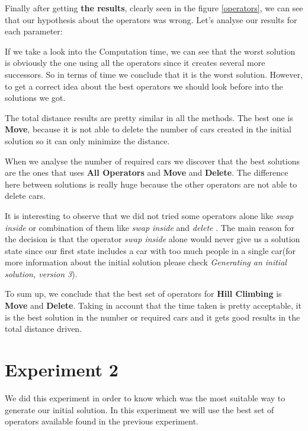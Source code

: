 \documentclass[12]{article}
\begin{document}
Finally after getting \textbf{the results}, clearly seen in the figure \ref{operators}, we can see that our hypothesis about the operators was wrong. Let's analyse our results for each parameter: 
\\
\smallskip

If we take a look into the Computation time, we can see that the worst solution is obviously the one using all the operators since it creates several more successors. So in terms of time we conclude that it is the worst solution. However, to get a correct idea about the best operators we should look before into the solutions we got. 
\\
\smallskip

The total distance results are pretty similar in all the methods. The best one is \textbf{Move}, because it is not able to delete the number of cars created in the initial solution so it can only minimize the distance.  
\\
\smallskip

When we analyse the number of required cars we discover that the best solutions are the ones that uses \textbf{All Operators} and \textbf{Move} and \textbf{Delete}. The difference here between solutions is really huge because the other operators are not  able to delete cars. 


It is interesting to observe that we did not tried some operators alone like \textit{swap inside} or combination of them like \textit{swap inside} and \textit{delete} . The main reason for the decision is that the operator \textit{swap inside} alone would never give us a solution state since our first state includes a car with too much people in a single car(for more information about the initial solution please check \textit{Generating an initial solution, version 3}). 
\\
\smallskip

To sum up, we conclude that the best set of operators for \textbf{Hill Climbing} is \textbf{Move} and \textbf{Delete}. Taking in account that the time taken is pretty acceptable, it is the best solution in the number or required cars and it gets good results in the total distance driven.

\section{Experiment 2}
We did this experiment in order to know which was the most suitable way to generate our initial solution. In this experiment we will use the best set of operators available found in the previous experiment.
\end{document}
